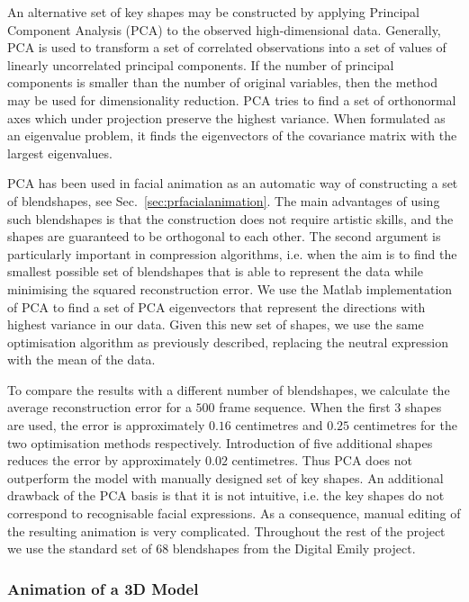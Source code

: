 An alternative set of key shapes may be constructed by applying Principal Component Analysis (PCA) to the observed high-dimensional data. Generally, PCA is used to transform a set of correlated observations into a set of values of linearly uncorrelated principal components. If the number of principal components is smaller than the number of original variables, then the method may be used for dimensionality reduction. PCA tries to find a set of orthonormal axes which under projection preserve the highest variance. When formulated as an eigenvalue problem, it finds the eigenvectors of the covariance matrix with the largest eigenvalues. 

PCA has been used in facial animation as an automatic way of constructing a set of blendshapes, see Sec.~\ref{sec:prfacialanimation}. The main advantages of using such blendshapes is that the construction does not require artistic skills, and the shapes are guaranteed to be orthogonal to each other. The second argument is particularly important in compression algorithms, i.e. when the aim is to find the smallest possible set of blendshapes that is able to represent the data while minimising the squared reconstruction error. We use the Matlab implementation of PCA to find a set of PCA eigenvectors that represent the directions with highest variance in our data. Given this new set of shapes, we use the same optimisation algorithm as previously described, replacing the neutral expression with the mean of the data.

To compare the results with a different number of blendshapes, we calculate the average reconstruction error for a $500$ frame sequence. When the first $3$ shapes are used, the error is approximately $0.16$ centimetres and $0.25$ centimetres for the two optimisation methods respectively. Introduction of five additional shapes reduces the error by approximately $0.02$ centimetres. Thus PCA does not outperform the model with manually designed set of key shapes. An additional drawback of the PCA basis is that it is not intuitive, i.e. the key shapes do not correspond to recognisable facial expressions. As a consequence, manual editing of the resulting animation is very complicated. Throughout the rest of the project we use the standard set of $68$ blendshapes from the Digital Emily project.

\subsubsection{Animation of a 3D Model}

